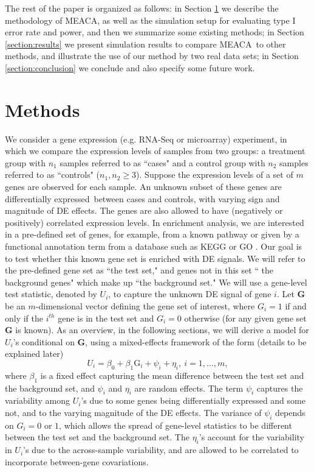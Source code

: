 \documentclass[a4,center,fleqn]{NAR}
\newcommand{\OurMethod}{MEACA}
\newcommand{\DED}{differentially expressed}
\begin{document}
The rest of the paper is organized as follows: in Section \ref{section:methods} we describe the
methodology of \OurMethod, as well as the simulation setup for evaluating type I error rate and 
power, and then we summarize some existing methods; in
Section \ref{section:results} we present simulation results to compare \OurMethod~to other 
methods, and illustrate the use of our method by two real data 
sets; in Section \ref{section:conclusion} we conclude and also specify some future work.

	
	\section{Methods}\label{section:methods}
	
	We consider a gene expression (e.g. RNA-Seq or microarray) experiment, in which we compare the 
	expression levels of samples from two groups: a treatment group with $n_1$ samples referred to 
	as ``cases" and a control group with $n_2$ samples referred to as ``controls" ($n_1,n_2\ge 3$). 
	Suppose the expression levels of a set of $m$ genes are observed for each sample. An unknown 
	subset of these genes are \DED~between cases and controls, with varying sign and magnitude of 
	DE effects. The genes are also allowed to have (negatively or positively) correlated expression 
	levels. In enrichment analysis, we are interested in a pre-defined set of genes, for example, 
	from a known pathway or given by a functional annotation term from a database such as KEGG
	\citep{kanehisa2000kegg} or GO \citep{ashburner2000gene}. Our goal is to test whether this known
	gene set is enriched with DE signals. We will refer to the pre-defined gene set as ``the test 
	set," and genes not in this set `` the background genes" which make up ``the background set."
	We will use a gene-level test statistic, denoted by $U_i$, to capture the unknown DE signal of 
	gene $i$. Let $\bm G$ be an $m$-dimensional vector defining the gene set of interest, where 
	$G_i=1$ if and only if the $i^{th}$ gene is in the test set and $G_i=0$ otherwise (for any 
	given gene set $\bm G$ is known). As an overview, in the 
	following sections, we will derive a model for $ U_i$'s conditional on 
	$\bm G$, using a mixed-effects framework of the form (details to be explained later)
	\begin{equation}\label{eq:overview}
	U_i = \beta_0 + \beta_1\text{G}_i  + \psi_i  + \eta_i, ~i = 1, \ldots, m,  
	\end{equation}
	where $\beta_1$ is a fixed effect capturing the mean difference between the test set and the 
	background set, and $\psi_i$ and $\eta_i$ are random effects. The term $\psi_i$ captures the 
	variability among $U_i$'s due to some genes being differentially expressed and some not, and to 
	the varying magnitude of the DE effects.
	The variance of $\psi_i$ depends on $G_i=0$ or $1$, which allows the spread of gene-level 
	statistics to be different between the test set and the background set. The $\eta_i$'s account 
	for the variability in $U_i$'s due to the across-sample variability, and are allowed to be 
	correlated to incorporate between-gene covariations.
	
\end{document}
